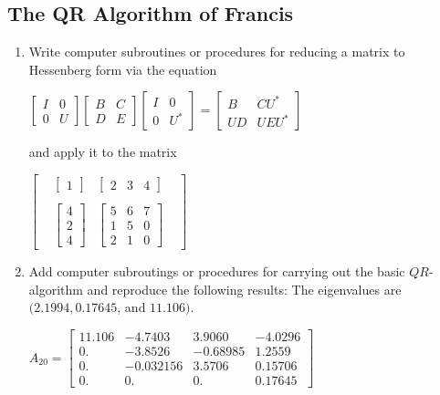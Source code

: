 \documentclass[12pt]{article}
\theoremstyle{definition}
\begin{document}
\subsection*{The QR Algorithm of Francis}
\noindent

\begin{enumerate}
\item Write computer subroutines or procedures for reducing a matrix to Hessenberg form via the equation \begin{center}$\begin{bmatrix}I&0\\0&U\end{bmatrix}\begin{bmatrix}B&C\\D&E\end{bmatrix}\begin{bmatrix}I&0\\0&U^*\end{bmatrix}=\begin{bmatrix}B&CU^*\\UD&UEU^*\end{bmatrix}$\end{center} and apply it to the matrix\begin{center}$\begin{bmatrix}&\begin{bmatrix}1\end{bmatrix}&\begin{bmatrix}2&3&4\end{bmatrix}&\\\\&\begin{bmatrix}4\\2\\4\end{bmatrix}&\begin{bmatrix}5&6&7\\1&5&0\\2&1&0\end{bmatrix}&\end{bmatrix}$\end{center}
\item Add computer subroutings or procedures for carrying out the basic $QR$-algorithm and reproduce the following results: The eigenvalues are $(2.1994,0.17645$, and $11.106)$. \begin{center}$A_{20}=\begin{bmatrix}11.106&-4.7403&3.9060&-4.0296\\0.&-3.8526&-0.68985&1.2559\\0.&-0.032156&3.5706&0.15706\\0.&0.&0.&0.17645\end{bmatrix}$\end{center}

\end{enumerate}
\end{document}
